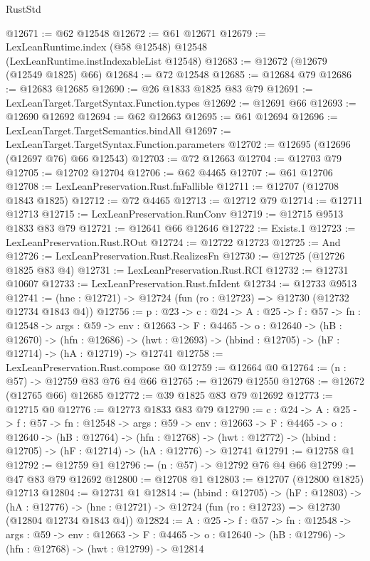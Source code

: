 \begin{lexlean}{RustStd}
\begin{coremodule}
@12671 := @62 @12548
@12672 := @61 @12671
@12679 := LexLeanRuntime.index (@58 @12548) @12548 (LexLeanRuntime.instIndexableList @12548)
@12683 := @12672 (@12679 (@12549 @1825) @66)
@12684 := @72 @12548
@12685 := @12684 @79
@12686 := @12683 @12685
@12690 := @26 @1833 @1825 @83 @79
@12691 := LexLeanTarget.TargetSyntax.Function.types
@12692 := @12691 @66
@12693 := @12690 @12692
@12694 := @62 @12663
@12695 := @61 @12694
@12696 := LexLeanTarget.TargetSemantics.bindAll
@12697 := LexLeanTarget.TargetSyntax.Function.parameters
@12702 := @12695 (@12696 (@12697 @76) @66 @12543)
@12703 := @72 @12663
@12704 := @12703 @79
@12705 := @12702 @12704
@12706 := @62 @4465
@12707 := @61 @12706
@12708 := LexLeanPreservation.Rust.fnFallible
@12711 := @12707 (@12708 @1843 @1825)
@12712 := @72 @4465
@12713 := @12712 @79
@12714 := @12711 @12713
@12715 := LexLeanPreservation.RunConv
@12719 := @12715 @9513 @1833 @83 @79
@12721 := @12641 @66 @12646
@12722 := Exists.{1}
@12723 := LexLeanPreservation.Rust.ROut
@12724 := @12722 @12723
@12725 := And
@12726 := LexLeanPreservation.Rust.RealizesFn
@12730 := @12725 (@12726 @1825 @83 @4)
@12731 := LexLeanPreservation.Rust.RCI
@12732 := @12731 @10607
@12733 := LexLeanPreservation.Rust.fnIdent
@12734 := @12733 @9513
@12741 := (hne : @12721) -> @12724 (fun (ro : @12723) => @12730 (@12732 @12734 @1843 @4))
@12756 := {p : @23} ->
  {c : @24} ->
  {A : @25} ->
  {f : @57} ->
  {fn : @12548} ->
  {args : @59} ->
  {env : @12663} ->
  {F : @4465} ->
  {o : @12640} ->
  (hB : @12670) ->
  (hfn : @12686) -> (hwt : @12693) -> (hbind : @12705) -> (hF : @12714) -> (hA : @12719) -> @12741
@12758 := LexLeanPreservation.Rust.compose @0
@12759 := @12664 @0
@12764 := (n : @57) -> @12759 @83 @76 @4 @66
@12765 := @12679 @12550
@12768 := @12672 (@12765 @66) @12685
@12772 := @39 @1825 @83 @79 @12692
@12773 := @12715 @0
@12776 := @12773 @1833 @83 @79
@12790 := {c : @24} ->
  {A : @25} ->
  {f : @57} ->
  {fn : @12548} ->
  {args : @59} ->
  {env : @12663} ->
  {F : @4465} ->
  {o : @12640} ->
  (hB : @12764) ->
  (hfn : @12768) -> (hwt : @12772) -> (hbind : @12705) -> (hF : @12714) -> (hA : @12776) -> @12741
@12791 := @12758 @1
@12792 := @12759 @1
@12796 := (n : @57) -> @12792 @76 @4 @66
@12799 := @47 @83 @79 @12692
@12800 := @12708 @1
@12803 := @12707 (@12800 @1825) @12713
@12804 := @12731 @1
@12814 := (hbind : @12705) ->
  (hF : @12803) ->
  (hA : @12776) -> (hne : @12721) -> @12724 (fun (ro : @12723) => @12730 (@12804 @12734 @1843 @4))
@12824 := {A : @25} ->
  {f : @57} ->
  {fn : @12548} ->
  {args : @59} ->
  {env : @12663} ->
  {F : @4465} -> {o : @12640} -> (hB : @12796) -> (hfn : @12768) -> (hwt : @12799) -> @12814

\end{coremodule}
\end{lexlean}
